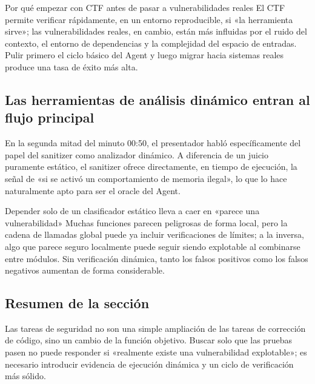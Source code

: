 \begin{importantbox}{Por qué empezar con CTF antes de pasar a vulnerabilidades reales}
El CTF permite verificar rápidamente, en un entorno reproducible, si «la herramienta sirve»; las vulnerabilidades reales, en cambio, están más influidas por el ruido del contexto, el entorno de dependencias y la complejidad del espacio de entradas. Pulir primero el ciclo básico del Agent y luego migrar hacia sistemas reales produce una tasa de éxito más alta.
\end{importantbox}

\subsection{Las herramientas de análisis dinámico entran al flujo principal}
En la segunda mitad del minuto 00:50, el presentador habló específicamente del papel del sanitizer como analizador dinámico. A diferencia de un juicio puramente estático, el sanitizer ofrece directamente, en tiempo de ejecución, la señal de «si se activó un comportamiento de memoria ilegal», lo que lo hace naturalmente apto para ser el oracle del Agent.

\begin{warningbox}{Depender solo de un clasificador estático lleva a caer en «parece una vulnerabilidad»}
Muchas funciones parecen peligrosas de forma local, pero la cadena de llamadas global puede ya incluir verificaciones de límites; a la inversa, algo que parece seguro localmente puede seguir siendo explotable al combinarse entre módulos. Sin verificación dinámica, tanto los falsos positivos como los falsos negativos aumentan de forma considerable.
\end{warningbox}

\subsection{Resumen de la sección}
Las tareas de seguridad no son una simple ampliación de las tareas de corrección de código, sino un cambio de la función objetivo. Buscar solo que las pruebas pasen no puede responder si «realmente existe una vulnerabilidad explotable»; es necesario introducir evidencia de ejecución dinámica y un ciclo de verificación más sólido.

